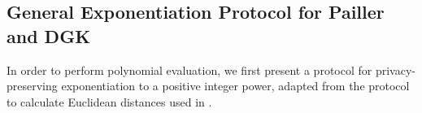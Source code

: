 

\subsection{General Exponentiation Protocol for Pailler and DGK}
\label{ssec:exponentiationprotocol}
In order to perform polynomial evaluation, we first present a protocol for privacy-preserving exponentiation to a positive integer power, adapted from the protocol to calculate Euclidean distances used in \cite{hutchison_privacy-preserving_2009}.

